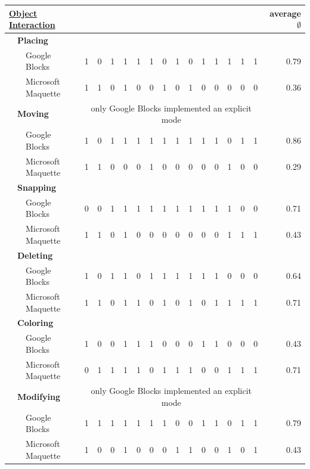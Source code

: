 \documentclass{report}
\begin{document}
		\begin{table}[H]
			\begin{tabular}{@{}|lll|llllllllllllll|r|@{}}
				\hline
				\multicolumn{3}{|l|}{\textbf{\underline{Object Interaction}}} & & & & & & & & & & & & & & & \textbf{average $\emptyset$} \\ \hline
				& \multicolumn{2}{l|}{\textbf{Placing}} & & & & & & & & & & & & & & &\\ \hline
				& & Google Blocks & 1 & 0 & 1 & 1 & 1 & 1 & 0 & 1 & 0 & 1 & 1 & 1 & 1 & 1 & 0.79 \\
				& & Microsoft Maquette & 1 & 1 & 0 & 1 & 0 & 0 & 1 & 0 & 1 & 0 & 0 & 0 & 0 & 0 & 0.36 \\ \hline
				
				& \multicolumn{2}{l|}{\textbf{Moving}} & \multicolumn{14}{c|}{\small{only Google Blocks implemented an explicit mode}} &\\ \hline
				& & Google Blocks & 1 & 0 & 1 & 1 & 1 & 1 & 1 & 1 & 1 & 1 & 1 & 0 & 1 & 1 & 0.86 \\
				& & Microsoft Maquette & 1 & 1 & 0 & 0 & 0 & 1 & 0 & 0 & 0 & 0 & 0 & 1 & 0 & 0 & 0.29 \\ \hline
				
				& \multicolumn{2}{l|}{\textbf{Snapping}} & & & & & & & & & & & & & & &\\ \hline
				& & Google Blocks & 0 & 0 & 1 & 1 & 1 & 1 & 1 & 1 & 1 & 1 & 1 & 1 & 0 & 0 & 0.71 \\
				& & Microsoft Maquette & 1 & 1 & 0 & 1& 0 & 0 & 0 & 0 & 0 & 0 & 0 & 1 & 1 & 1 & 0.43 \\ \hline
				
				& \multicolumn{2}{l|}{\textbf{Deleting}} & & & & & & & & & & & & & & &\\ \hline
				& & Google Blocks & 1 & 0 & 1 & 1 & 0 & 1 & 1 & 1 & 1 & 1 & 1 & 0 & 0 & 0 & 0.64 \\
				& & Microsoft Maquette & 1 & 1 & 0 & 1 & 1 & 0 & 1 & 0 & 1 & 0 & 1 & 1 & 1& 1 & 0.71\\ \hline
				
				& \multicolumn{2}{l|}{\textbf{Coloring}} & & & & & & & & & & & & & & &\\ \hline
				& & Google Blocks & 1 & 0 & 0 & 1 & 1 & 1 & 0 & 0 & 0 & 1 & 1 & 0 & 0 & 0 & 0.43 \\
				& & Microsoft Maquette & 0 & 1 & 1 & 1 & 1 & 0 & 1 & 1 & 1 & 0 & 0 & 1 & 1 & 1 & 0.71 \\ \hline
				
				& \multicolumn{2}{l|}{\textbf{Modifying}} & \multicolumn{14}{c|}{\small{only Google Blocks implemented an explicit mode}} &\\ \hline
				& & Google Blocks & 1 & 1 & 1 & 1 & 1 & 1 & 1 & 0 & 0 & 1 & 1 & 0 & 1 & 1 & 0.79\\
				& & Microsoft Maquette & 1 & 0 & 0 & 1 & 0 & 0 & 0 & 1 & 1 & 0 & 0 & 1 & 0 & 1 & 0.43 \\ \hline


\end{tabular}
\end{table}
\end{document}
